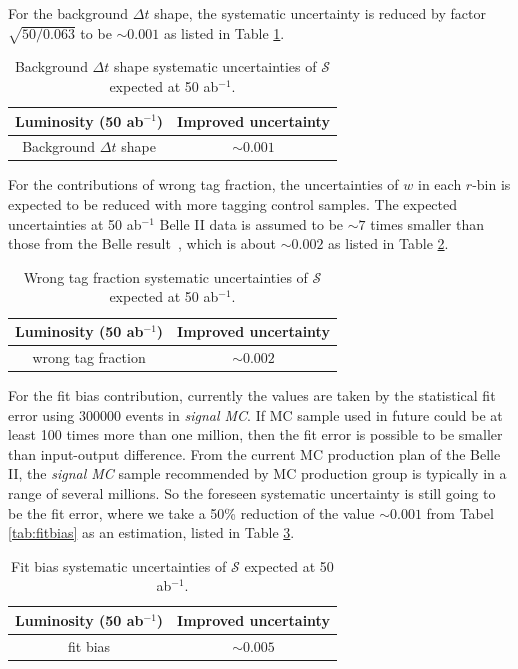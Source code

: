 For the background $\Delta t$ shape, the systematic uncertainty is reduced by factor $\sqrt{50/0.063}$ to be $\sim 0.001$ as listed in Table \ref{tab:bkg_shape}.

\begin{table}[htpb]
	\centering
	\caption{ Background $\Delta t$ shape systematic uncertainties of $\mathcal{S}$ expected at 50 ab$^{-1}$.}
	\label{tab:bkg_shape}
	\begin{tabular}{c| c}
		\hline
		Luminosity (50 ab$^{-1}$) & Improved uncertainty \\
		\hline
		Background $\Delta t$ shape &  $\sim0.001$ \\
		\hline
	\end{tabular}
\end{table}

For the contributions of wrong tag fraction, the uncertainties of $w$ in each $r$-bin is expected to be reduced with more tagging control samples.  The expected uncertainties at 50 ab$^{-1}$ Belle II data is assumed to be $\sim 7$ times smaller than those from the Belle result~\cite{kang2020measurement}, which is about $\sim0.002$ as listed in Table \ref{tab:wtag_50ab}.

\begin{table}[htpb]
	\centering
	\caption{ Wrong tag fraction systematic uncertainties of $\mathcal{S}$ expected at 50 ab$^{-1}$.}
	\label{tab:wtag_50ab}
	\begin{tabular}{c| c}
		\hline
		Luminosity (50 ab$^{-1}$) & Improved uncertainty \\
		\hline
		wrong tag fraction &  $\sim0.002$\\
		\hline
	\end{tabular}
\end{table}

For the fit bias contribution, currently the values are taken by the statistical fit error using 300000 events in \textit{signal MC}. If MC sample used in future could be at least 100 times more than one million, then the fit error is possible to be smaller than input-output difference. From the current MC production plan of the Belle II, the  \textit{signal MC} sample recommended by MC production group is typically in a range of several millions. So the foreseen systematic uncertainty is still going to be the fit error, where we take a 50\% reduction of the value $\sim0.001$ from Tabel \ref{tab:fitbias} as an estimation, listed in Table \ref{tab:fitbias_full}.

\begin{table}[htpb]
	\centering
	\caption{ Fit bias systematic uncertainties of $\mathcal{S}$ expected at 50 ab$^{-1}$.}
	\label{tab:fitbias_full}
	\begin{tabular}{c| c}
		\hline
		Luminosity (50 ab$^{-1}$) & Improved uncertainty \\
		\hline
		fit bias &  $\sim 0.005$ \\
		\hline
	\end{tabular}
\end{table}

